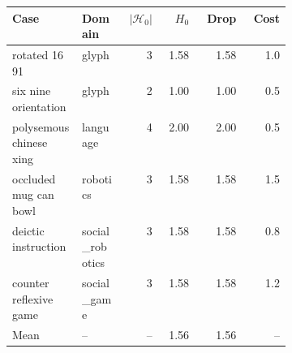\begin{tabular}{p{0.25\linewidth}p{0.15\linewidth}rrrr}
\toprule
Case & Domain & $|\mathcal{H}_0|$ & $H_0$ & Drop & Cost \\
\midrule
rotated 16 91 & glyph & 3 & 1.58 & 1.58 & 1.0 \\
six nine orientation & glyph & 2 & 1.00 & 1.00 & 0.5 \\
polysemous chinese xing & language & 4 & 2.00 & 2.00 & 0.5 \\
occluded mug can bowl & robotics & 3 & 1.58 & 1.58 & 1.5 \\
deictic instruction & social\_robotics & 3 & 1.58 & 1.58 & 0.8 \\
counter reflexive game & social\_game & 3 & 1.58 & 1.58 & 1.2 \\
\midrule
Mean & -- & -- & 1.56 & 1.56 & -- \\
\bottomrule
\end{tabular}

